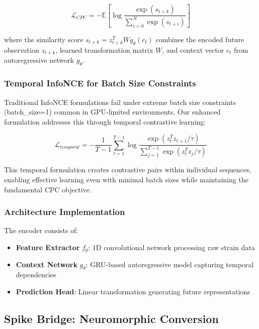 \documentclass[12pt,a4paper]{article}
\begin{document}
\begin{equation}
\mathcal{L}_{CPC} = -\mathbb{E}\left[\log \frac{\exp(s_{t+k})}{\sum_{i=0}^{N} \exp(s_{t+i})}\right]
\end{equation}

where the similarity score $s_{t+k} = z_{t+k}^T W g_\theta(c_t)$ combines the encoded future observation $z_{t+k}$, learned transformation matrix $W$, and context vector $c_t$ from autoregressive network $g_\theta$.

\subsubsection{Temporal InfoNCE for Batch Size Constraints}

Traditional InfoNCE formulations fail under extreme batch size constraints (batch\_size=1) common in GPU-limited environments. Our enhanced formulation addresses this through temporal contrastive learning:

\begin{equation}
\mathcal{L}_{temporal} = -\frac{1}{T-1}\sum_{t=1}^{T-1} \log \frac{\exp(z_t^T z_{t+1} / \tau)}{\sum_{j=1}^{T-1} \exp(z_t^T z_j / \tau)}
\end{equation}

This temporal formulation creates contrastive pairs within individual sequences, enabling effective learning even with minimal batch sizes while maintaining the fundamental CPC objective.

\subsubsection{Architecture Implementation}

The encoder consists of:
\begin{itemize}
\item \textbf{Feature Extractor} $f_\theta$: 1D convolutional network processing raw strain data
\item \textbf{Context Network} $g_\theta$: GRU-based autoregressive model capturing temporal dependencies
\item \textbf{Prediction Head}: Linear transformation generating future representations
\end{itemize}

\subsection{Spike Bridge: Neuromorphic Conversion}
\end{document}
